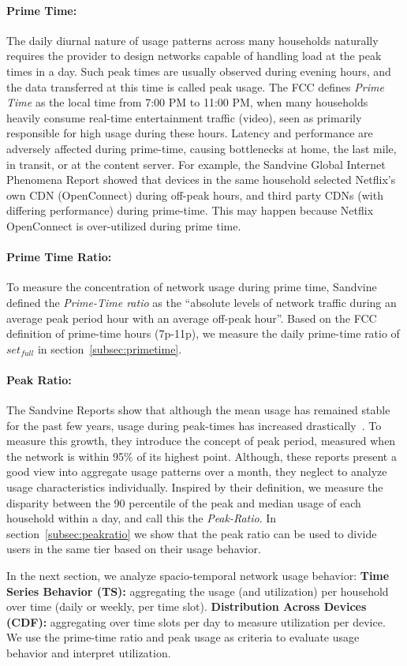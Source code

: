 \paragraph{Prime Time: }The daily diurnal nature of usage patterns across many
households naturally requires the provider to design networks capable of handling 
load at the peak times in a day. Such peak times are usually observed during
evening hours, and the data transferred at this time is called peak usage.
The FCC defines \emph{Prime Time} as the local time from 7:00 PM to 11:00 PM, when many
households heavily consume real-time entertainment traffic (video), seen as primarily
responsible for high usage during these hours. Latency and performance are adversely
affected during prime-time, causing bottlenecks at home, the last mile, in
transit, or at the content server. For example, the Sandvine Global
Internet Phenomena Report showed that devices in the same household selected Netflix's
own CDN (OpenConnect) during off-peak hours, and third party CDNs (with differing performance)
during prime-time. This may happen because Netflix OpenConnect is over-utilized during prime time.

\paragraph{Prime Time Ratio: }To measure the concentration of network usage during prime time,
Sandvine defined the \emph{Prime-Time ratio} as the ``absolute levels of network traffic
during an average peak period hour with an average off-peak hour''. Based on the FCC
definition of prime-time hours (7p-11p), we measure the daily prime-time ratio of $set_{full}$
in section~\ref{subsec:primetime}.

\paragraph{Peak Ratio: }The Sandvine Reports show that although the mean usage has remained
stable for the past few years, usage during peak-times has increased
drastically~\cite{sandvine1}. To measure this growth, they introduce the
concept of peak period, measured when the network is within 95\% of its highest point.
Although, these reports present a good view into aggregate usage patterns over a month,
they neglect to analyze usage characteristics individually. Inspired by their
definition, we measure the disparity between the 90 percentile of the peak and median
usage of each household within a day, and call this the \emph{Peak-Ratio}. In
section~\ref{subsec:peakratio} we show that the peak ratio can be used
to divide users in the same tier based on their usage behavior.

In the next section, we analyze spacio-temporal network usage behavior:
\textbf{Time Series Behavior (TS): }aggregating the usage (and utilization) per household
over time (daily or weekly, per time slot). \textbf{Distribution Across Devices (CDF): }aggregating over time slots per day to measure utilization per device. We use the prime-time ratio and peak usage
as criteria to evaluate usage behavior and interpret utilization.